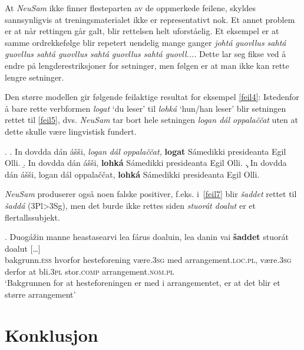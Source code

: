 \documentclass{flammie}
\begin{document}
At \textit{NeuSam} ikke finner flesteparten av de oppmerkede feilene, skyldes
sannsynligvis at treningsmaterialet ikke er representativt nok. Et annet problem
er at når rettingen går galt, blir rettelsen helt uforståelig. Et eksempel er at
samme ordrekkefølge blir repetert uendelig mange ganger \textit{johtá guovllus
sahtá guovllus sahtá guovllus sahtá guovllus sahtá guovll...}. Dette lar seg
fikse ved å endre på lengderestriksjoner for setninger, men følgen er at man
ikke kan rette lengre setninger.


Den større modellen gir følgende feilaktige resultat for eksempel \ref{feil4}:
Istedenfor å bare rette verbformen \textit{logat} `du leser' til \textit{lohká}
`hun/han leser' blir setningen rettet til \ref{feil5}, dvs. \textit{NeuSam} tar
bort hele setningen \textit{logan dál oppalaččat} uten at dette skulle være
lingvistisk fundert.

\ex.
\a.	In dovdda dán ášši, \textit{logan dál oppalaččat,}  \textbf{logat} Sámedikki presideanta Egil Olli.\label{feil4}
\b. In dovdda dán ášši,  \textbf{lohká} Sámedikki presideanta Egil Olli.\label{feil5}
\c. In dovdda dán ášši, logan dál oppalaččat,  \textbf{lohká} Sámedikki presideanta Egil Olli.\label{feil6}


\textit{NeuSam} produserer også noen falske positiver, f.eks.  i~\ref{feil7}
blir \textit{šaddet} rettet til \textit{šaddá} (3Pl>3Sg), men det burde ikke
rettes siden \textit{stuorát doalut} er et flertallssubjekt.

\exg. Duogážin manne heastasearvi lea fárus doaluin, lea danin vai \textbf{šaddet} stuorát doalut [\ldots]\label{feil7}\\
bakgrunn\textsc{.ess} hvorfor hesteforening være\textsc{.3sg} med arrangement\textsc{.loc.pl}, være\textsc{.3sg} derfor at bli\textsc{.3pl} stor\textsc{.comp} arrangement\textsc{.nom.pl}\\
`Bakgrunnen for at hesteforeningen er med i arrangementet, er at det blir et større arrangement'


\section{Konklusjon}
\end{document}
